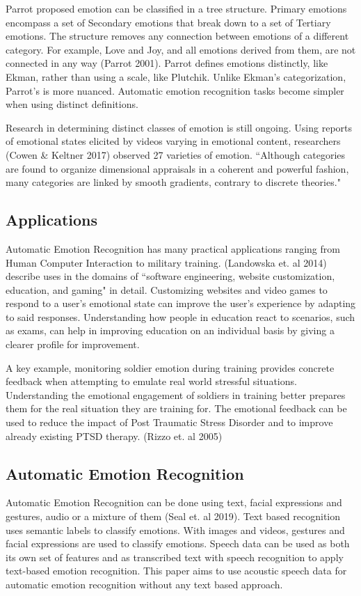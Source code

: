 	Parrot proposed emotion can be classified in a tree structure. Primary emotions encompass a set of Secondary emotions that break down to a set of Tertiary emotions. The structure removes any connection between emotions of a different category. For example, Love and Joy, and all emotions derived from them, are not connected in any way (Parrot 2001). Parrot defines emotions distinctly, like Ekman, rather than using a scale, like Plutchik. Unlike Ekman's categorization, Parrot's is more nuanced. Automatic emotion recognition tasks become simpler when using distinct definitions.
	
	Research in determining distinct classes of emotion is still ongoing. Using reports of emotional states elicited by videos varying in emotional content, researchers (Cowen \& Keltner 2017) observed 27 varieties of emotion. ``Although categories are found to organize dimensional appraisals in a coherent and powerful fashion, many categories are linked by smooth gradients, contrary to discrete theories."
	
\subsection{Applications}
	Automatic Emotion Recognition has many practical applications ranging from Human Computer Interaction to military training. (Landowska et. al 2014) describe uses in the domains of ``software engineering, website customization, education, and gaming" in detail. Customizing websites and video games to respond to a user's emotional state can improve the user's experience by adapting to said responses. Understanding how people in education react to scenarios, such as exams, can help in improving education on an individual basis by giving a clearer profile for improvement.
	
	A key example, monitoring soldier emotion during training provides concrete feedback when attempting to emulate real world stressful situations. Understanding the emotional engagement of soldiers in training better prepares them for the real situation they are training for. The emotional feedback can be used to reduce the impact of Post Traumatic Stress Disorder and to improve already existing PTSD therapy. (Rizzo et. al 2005)
	
\subsection{Automatic Emotion Recognition}
	Automatic Emotion Recognition can be done using text, facial expressions and gestures, audio or a mixture of them (Seal et. al 2019). Text based recognition uses semantic labels to classify emotions. With images and videos, gestures and facial expressions are used to classify emotions. Speech data can be used as both its own set of features and as transcribed text with speech recognition to apply text-based emotion recognition. This paper aims to use acoustic speech data for automatic emotion recognition without any text based approach.

